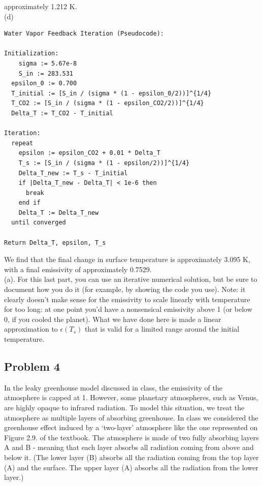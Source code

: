 \documentclass[letterpaper, 11pt]{article}
\newcommand{\1}{\mathds{1}}	%
\theoremstyle{definition}
\begin{document}
approximately 1.212 K.
\\(d)
\begin{verbatim}
Water Vapor Feedback Iteration (Pseudocode):

Initialization:
    sigma := 5.67e-8
    S_in := 283.531
  epsilon_0 := 0.700
  T_initial := [S_in / (sigma * (1 - epsilon_0/2))]^{1/4}
  T_CO2 := [S_in / (sigma * (1 - epsilon_CO2/2))]^{1/4}
  Delta_T := T_CO2 - T_initial

Iteration:
  repeat
    epsilon := epsilon_CO2 + 0.01 * Delta_T
    T_s := [S_in / (sigma * (1 - epsilon/2))]^{1/4}
    Delta_T_new := T_s - T_initial
    if |Delta_T_new - Delta_T| < 1e-6 then
      break
    end if
    Delta_T := Delta_T_new
  until converged

Return Delta_T, epsilon, T_s
\end{verbatim}
We find that the final change in surface temperature is approximately 3.095 K, with a final emissivity of approximately 0.7529.
\\
(a). For this last part, you can use an iterative numerical solution, but be sure to document how you do it (for example, by showing the code you use). Note: it clearly doesn't make sense for the emissivity to scale linearly with temperature for too long: at one point you'd have a nonsensical emissivity above 1 (or below 0, if you cooled the planet). What we have done here is made a linear approximation to $\epsilon(T_s)$ that is valid for a limited range around the initial temperature.



\subsection*{Problem 4}
In the leaky greenhouse model discussed in class, the emissivity of the atmosphere is capped at 1. However, some planetary atmospheres, such as Venus, are highly opaque to infrared radiation. To model this situation, we treat the atmosphere as multiple layers of absorbing greenhouse. In class we considered the greenhouse effect induced by a `two-layer' atmosphere like the one represented on Figure 2.9. of the textbook. The atmosphere is made of two fully absorbing layers A and B - meaning that each layer absorbs all radiation coming from above and below it. (The lower layer (B) absorbs all the radiation coming from the top layer (A) and the surface. The upper layer (A) absorbs all the radiation from the lower layer.)
\end{document}
